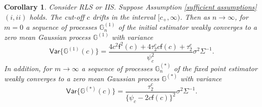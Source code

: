\documentclass[11pt, letterpaper]{article}
\newtheorem{corollary}{Corollary}
\numberwithin{algorithm}{section}
\numberwithin{assumption}{section}
\numberwithin{lemma}{section}
\numberwithin{theorem}{section}
\numberwithin{corollary}{section}
\numberwithin{remark}{section}
\numberwithin{equation}{section}
\numberwithin{figure}{section}
\numberwithin{table}{section}
\begin{document}
\begin{corollary} \label{weak convergence for the first step and fixed point of RLS and IIS}
Consider RLS or IIS. Suppose Assumption \ref{sufficient assumptions}$(i, ii)$ holds. The cut-off $c$ drifts in the interval $[c_{+}, \infty)$. Then as $n \to \infty$, for $m = 0$ a sequence of processes $\mathbb{G}_{n}^{(1)}$ of the initial estimator weakly converges to a zero mean Gaussian process $\mathbb{G}^{(1)}$ with variance
\begin{equation*}
\mathsf{Var} \{ \mathbb{G}^{(1)}(c) \} = \frac{4 c^{2} \mathsf{f}^{2}(c) + 4 \tau_{2}^{c} c \mathsf{f}(c) + \tau_{2}^{c}}{\psi_{c}^{2}} \sigma^{2} \Sigma^{-1}.
\end{equation*}
In addition, for $m \to \infty$ a sequence of processes $\mathbb{G}_{n}^{(\ast)}$ of the fixed point estimator weakly converges to a zero mean Gaussian process $\mathbb{G}^{(\ast)}$ with variance
\begin{equation*}
\mathsf{Var} \{ \mathbb{G}^{(\ast)}(c) \} = \frac{\tau_{2}^{c}}{\{ \psi_{c} - 2 c \mathsf{f}(c) \}^{2}} \sigma^{2} \Sigma^{-1}.
\end{equation*}
\end{corollary}
\end{document}
